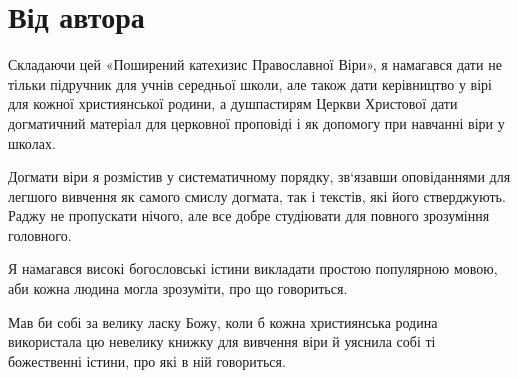 \documentclass[main.tex]{subfiles}
\begin{document}
\chapter{Від автора}
Складаючи цей «Поширений катехизис Православної Віри», я намагався дати не тільки підручник для учнів середньої школи, але також дати керівництво у вірі для кожної християнської родини, а душпастирям Церкви Христової дати догматичний матеріал для церковної проповіді і як допомогу при навчанні віри у школах.

Догмати віри я розмістив у систематичному порядку, зв`язавши оповіданнями для легшого вивчення як самого смислу догмата, так і текстів, які його стверджують. Раджу не пропускати нічого, але все добре студіювати для повного зрозуміння головного.

Я намагався високі богословські істини викладати простою популярною мовою, аби кожна людина могла зрозуміти, про що говориться.

Мав би собі за велику ласку Божу, коли б кожна християнська родина використала цю невелику книжку для вивчення віри й уяснила собі ті божественні істини, про які в ній говориться.
\end{document}
